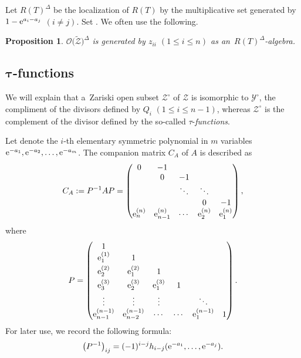 \documentclass[pdftex]{sigma}
\numberwithin{equation}{section}
\newcommand{\reg}{\Delta}
\newcommand{\Rep}{{R(T)}}
\newtheorem{Proposition}[Theorem]{Proposition}
\theoremstyle{definition}
\begin{document}
Let $\Rep^\reg$ be the localization of $\Rep$ by
the multiplicative set generated by $1-{\rm e}^{a_i-a_j}$ $(i\ne j)$.
Set \smash{$\mathscr{O}\bigl(\tilde{\mathscr{Z}}\bigr)^\reg
:=\Rep^\reg\otimes_{\Rep}\mathscr{O}\bigl(\tilde{\mathscr{Z}}\bigr)$}.
We often use the following.
\begin{Proposition}\label{prop:OZ_Delta}
$\mathscr{O}\bigl(\tilde{\mathscr{Z}}\bigr)^\reg$
is generated by $z_{ii}$ $(1\le i\le n)$ as
an~$\Rep^\reg$-algebra.
\end{Proposition}

\subsection[tau-functions]{$\boldsymbol{\tau}$-functions}\label{sec:tau}
We will explain that a~Zariski open subset $\mathscr{Z}^\circ$ of $\mathscr{Z}$ is isomorphic to
$\mathscr{Y}^\circ$, the compliment of the divisors defined by $Q_i$ $(1\le i\le n-1)$, whereas
$\mathscr{Z}^\circ$ is the complement of the divisor defined by the so-called $\tau$-\emph{functions}.

Let  denote the $i$-th elementary symmetric polynomial in $m$ variables ${\rm e}^{-a_1},{\rm e}^{-a_2},\dots,{\rm e}^{-a_m}$.
The companion matrix $C_A$ of $A$ is described as
\begin{equation}
\label{eq:C_A}
C_A:=P^{-1}AP
=\begin{pmatrix}
0& -1 \\
&0& -1 \\
& & \ddots&\ddots \\
&& & 0&-1\\
{\rm e}^{(n)}_n& {\rm e}^{(n)}_{n-1}&\cdots &{\rm e}^{(n)}_2&{\rm e}^{(n)}_1\\
\end{pmatrix},
\end{equation}
where
\begin{equation}
\label{eq:P}
P=
\begin{pmatrix}
1\\
{\rm e}^{(1)}_1 & 1\\[1mm]
{\rm e}^{(2)}_2 & {\rm e}^{(2)}_1 & 1\\[1mm]
{\rm e}^{(3)}_3 & {\rm e}^{(3)}_2 & {\rm e}^{(3)}_1&1\\[1mm]
\vdots & \vdots & \vdots & & \ddots\\
{\rm e}^{(n-1)}_{n-1}& {\rm e}^{(n-1)}_{n-2}&\cdots &\cdots&{\rm e}^{(n-1)}_1 & 1
\end{pmatrix}.
\end{equation}
For later use, we record the following formula:
\[
 \bigl(P^{-1}\bigr)_{ij}=(-1)^{i-j}h_{i-j}({\rm e}^{-a_1},\dots,{\rm e}^{-a_{j}}).
\]
\end{document}
